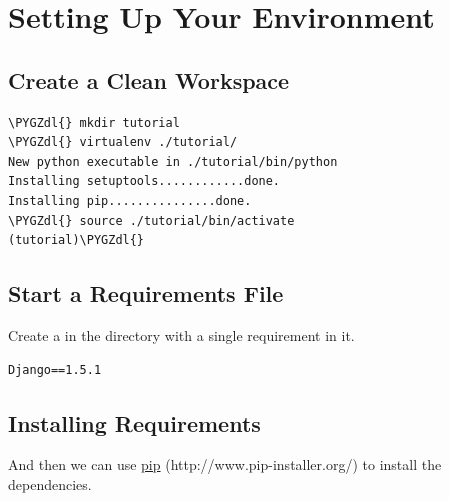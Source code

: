 \documentclass[letterpaper,10pt,english]{sphinxmanual}
\def\PYGZdl{\char`\$}
\begin{document}
\section{Setting Up Your Environment}
\label{tutorial/getting-started:setting-up-your-environment}\label{tutorial/getting-started:vagrant}

\subsection{Create a Clean Workspace}
\label{tutorial/getting-started:create-a-clean-workspace}
\begin{Verbatim}[commandchars=\\\{\}]
\PYGZdl{} mkdir tutorial
\PYGZdl{} virtualenv ./tutorial/
New python executable in ./tutorial/bin/python
Installing setuptools............done.
Installing pip...............done.
\PYGZdl{} source ./tutorial/bin/activate
(tutorial)\PYGZdl{}
\end{Verbatim}


\subsection{Start a Requirements File}
\label{tutorial/getting-started:example-repository}\label{tutorial/getting-started:start-a-requirements-file}
Create a  in the  directory with a
single requirement in it.

\begin{Verbatim}[commandchars=\\\{\}]
Django==1.5.1
\end{Verbatim}


\subsection{Installing Requirements}
\label{tutorial/getting-started:installing-requirements}
And then we can use \href{http://www.pip-installer.org/}{pip} (http://www.pip-installer.org/) to install the dependencies.
\end{document}
